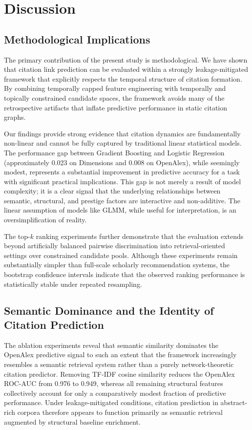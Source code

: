 \documentclass[11pt,a4paper]{article}
\begin{document}
\section{Discussion}
\label{sec:discussion}

\subsection{Methodological Implications}

The primary contribution of the present study is methodological. We have shown that citation link prediction can be evaluated within a strongly leakage-mitigated framework that explicitly respects the temporal structure of citation formation. By combining temporally capped feature engineering with temporally and topically constrained candidate spaces, the framework avoids many of the retrospective artifacts that inflate predictive performance in static citation graphs.

Our findings provide strong evidence that citation dynamics are fundamentally non-linear and cannot be fully captured by traditional linear statistical models. The performance gap between Gradient Boosting and Logistic Regression (approximately 0.023 on Dimensions and 0.008 on OpenAlex), while seemingly modest, represents a substantial improvement in predictive accuracy for a task with significant practical implications. This gap is not merely a result of model complexity; it is a clear signal that the underlying relationships between semantic, structural, and prestige factors are interactive and non-additive. The linear assumption of models like GLMM, while useful for interpretation, is an oversimplification of reality.

The top-\(k\) ranking experiments further demonstrate that the evaluation extends beyond artificially balanced pairwise discrimination into retrieval-oriented settings over constrained candidate pools. Although these experiments remain substantially simpler than full-scale scholarly recommendation systems, the bootstrap confidence intervals indicate that the observed ranking performance is statistically stable under repeated resampling.

\subsection{Semantic Dominance and the Identity of Citation Prediction}

The ablation experiments reveal that semantic similarity dominates the OpenAlex predictive signal to such an extent that the framework increasingly resembles a semantic retrieval system rather than a purely network-theoretic citation predictor. Removing TF-IDF cosine similarity reduces the OpenAlex ROC-AUC from 0.976 to 0.949, whereas all remaining structural features collectively account for only a comparatively modest fraction of predictive performance. Under leakage-mitigated conditions, citation prediction in abstract-rich corpora therefore appears to function primarily as semantic retrieval augmented by structural baseline enrichment.
\end{document}
